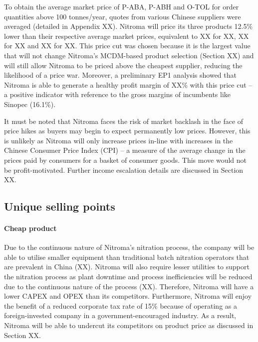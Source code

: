 To obtain the average market price of P-ABA, P-ABH and O-TOL for order quantities above 100 tonnes/year, quotes from various Chinese suppliers were averaged (detailed in Appendix XX).  Nitroma will price its three products 12.5\% lower than their respective average market prices, equivalent to XX for XX, XX for XX and XX for XX. This price cut was chosen because it is the largest value that will not change Nitroma’s MCDM-based product selection (Section XX) and will still allow Nitroma to be priced above the cheapest supplier, reducing the likelihood of a price war. Moreover, a preliminary EP1 analysis showed that Nitroma is able to generate a healthy profit margin of XX\% with this price cut – a positive indicator with reference to the gross margins of incumbents like Sinopec (16.1\%). 

It must be noted that Nitroma faces the risk of market backlash in the face of price hikes as buyers may begin to expect permanently low prices. However, this is unlikely as Nitroma will only increase prices in-line with increases in the Chinese Consumer Price Index (CPI) – a measure of the average change in the prices paid by consumers for a basket of consumer goods. This move would not be profit-motivated. Further income escalation details are discussed in Section XX.

\subsection{Unique selling points}
\paragraph{Cheap product}
Due to the continuous nature of Nitroma’s nitration process, the company will be able to utilise smaller equipment than traditional batch nitration operators that are prevalent in China (XX). Nitroma will also require lesser utilities to support the nitration process as plant downtime and process inefficiencies will be reduced due to the continuous nature of the process (XX). Therefore, Nitroma will have a lower CAPEX and OPEX than its competitors. Furthermore, Nitroma will enjoy the benefit of a reduced corporate tax rate of 15\% because of operating as a foreign-invested company in a government-encouraged industry. As a result, Nitroma will be able to undercut its competitors on product price as discussed in Section XX.
